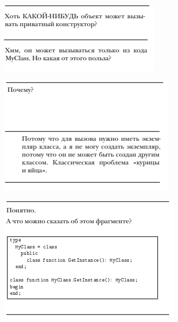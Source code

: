 \documentclass{beamer}
\begin{document}
\begin{frame}
\begin{figure}[h]
\centering
\includegraphics[scale=1.0]{images/lec11-pic06.png}
\label{pic-sort}
\end{figure}
\end{frame}

\begin{frame}
\begin{figure}[h]
\centering
\includegraphics[scale=1.0]{images/lec11-pic07.png}
\label{pic-sort}
\end{figure}
\end{frame}

\begin{frame}
\begin{figure}[h]
\centering
\includegraphics[scale=1.0]{images/lec11-pic08.png}
\label{pic-sort}
\end{figure}
\end{frame}
\end{document}

